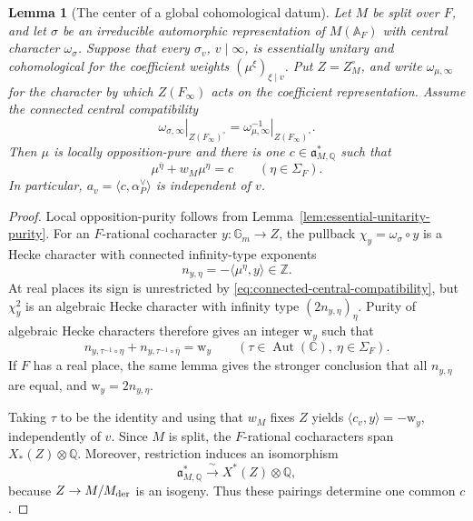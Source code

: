 \documentclass[12pt]{amsart}
\numberwithin{equation}{section}
\theoremstyle{plain}
\newtheorem{lemma}[theorem]{Lemma}
\theoremstyle{definition}
\theoremstyle{remark}
\renewcommand{\bar}{\overline}
\begin{document}
\begin{lemma}[The center of a global cohomological datum] \label{lem:global-center}
Let $M$ be split over $F$, and let $\sigma$ be an irreducible automorphic representation of $M(\mathbb A_F)$ with central character $\omega_\sigma$. Suppose that every $\sigma_v$, $v\mid\infty$, is essentially unitary and cohomological for the coefficient weights $(\mu^\xi)_{\xi\mid v}$. Put $Z=Z_M^\circ$, and write $\omega_{\mu,\infty}$ for the character by which $Z(F_\infty)$ acts on the coefficient representation. Assume the connected central compatibility
\begin{equation}\label{eq:connected-central-compatibility}
 \left.\omega_{\sigma,\infty}\right|_{Z(F_\infty)^\circ}
 =\left.\omega_{\mu,\infty}^{-1}\right|_{Z(F_\infty)^\circ}.
\end{equation}
Then $\mu$ is locally opposition-pure and there is one $c\in\mathfrak a_{M,\mathbb Q}^*$ such that 
\[
 \mu^{\bar\eta}+w_M\mu^\eta=c
 \qquad(\eta\in\Sigma_F).
\]
In particular, $a_v=\langle c,\alpha_P^\vee\rangle$ is independent of $v$. 
\end{lemma}

\begin{proof}
Local opposition-purity follows from Lemma~\ref{lem:essential-unitarity-purity}. For an $F$-rational cocharacter $y:\mathbb G_m\to Z$, the pullback $\chi_y=\omega_\sigma\circ y$ is a Hecke character with connected infinity-type exponents 
\[
 n_{y,\eta}=-\langle\mu^\eta,y\rangle\in\mathbb Z.
\]
At real places its sign is unrestricted by \eqref{eq:connected-central-compatibility}, but $\chi_y^2$ is an algebraic Hecke character with infinity type $(2n_{y,\eta})_\eta$. Purity of algebraic Hecke characters \cite[\S4.1, Lemma~17]{RaghuramHecke2022} therefore gives an integer $\mathrm{w}_y$ such that 
\begin{equation}\label{eq:central-exponent-purity}
 n_{y,\tau^{-1}\circ\eta}+n_{y,\tau^{-1}\circ\bar\eta}=\mathrm{w}_y
 \qquad(\tau\in\operatorname{Aut}(\mathbb C),\ \eta\in\Sigma_F).
\end{equation}
If $F$ has a real place, the same lemma gives the stronger conclusion that all $n_{y,\eta}$ are equal, and $\mathrm{w}_y=2n_{y,\eta}$.

Taking $\tau$ to be the identity and using that $w_M$ fixes $Z$ yields $\langle c_v,y\rangle=-\mathrm{w}_y$, independently of $v$. Since $M$ is split, the $F$-rational cocharacters span $X_*(Z)\otimes\mathbb Q$. Moreover, restriction induces an isomorphism 
\[
 \mathfrak a_{M,\mathbb Q}^*
 \xrightarrow{\ \sim\ }X^*(Z)\otimes\mathbb Q,
\]
because $Z\to M/M_{\rm der}$ is an isogeny. Thus these pairings determine one common $c$. 
\end{proof}
\end{document}
